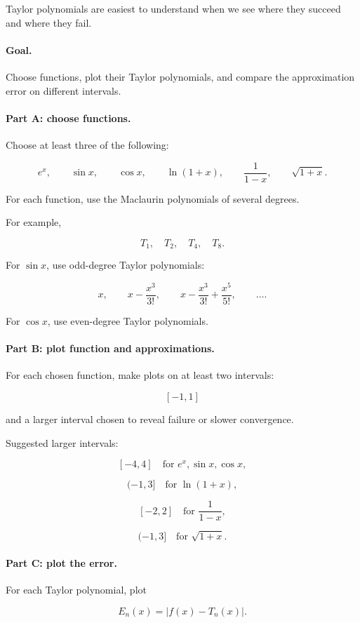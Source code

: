 Taylor polynomials are easiest to understand when we see where they succeed and where
they fail.

\paragraph{Goal.}
Choose functions, plot their Taylor polynomials, and compare the approximation error
on different intervals.

\paragraph{Part A: choose functions.}
Choose at least three of the following:

\[
e^x,\qquad
\sin x,\qquad
\cos x,\qquad
\ln(1+x),\qquad
\frac1{1-x},\qquad
\sqrt{1+x}.
\]

For each function, use the Maclaurin polynomials of several degrees.

For example,

\[
T_1,\quad T_2,\quad T_4,\quad T_8.
\]

For \(\sin x\), use odd-degree Taylor polynomials:

\[
x,\qquad
x-\frac{x^3}{3!},\qquad
x-\frac{x^3}{3!}+\frac{x^5}{5!},\qquad \ldots.
\]

For \(\cos x\), use even-degree Taylor polynomials.

\paragraph{Part B: plot function and approximations.}
For each chosen function, make plots on at least two intervals:

\[
[-1,1]
\]

and a larger interval chosen to reveal failure or slower convergence.

Suggested larger intervals:

\[
[-4,4]\quad \text{for } e^x,\sin x,\cos x,
\]

\[
(-1,3]\quad \text{for } \ln(1+x),
\]

\[
[-2,2]\quad \text{for } \frac1{1-x},
\]

\[
(-1,3]\quad \text{for } \sqrt{1+x}.
\]

\paragraph{Part C: plot the error.}
For each Taylor polynomial, plot

\[
E_n(x)=|f(x)-T_n(x)|.
\]

